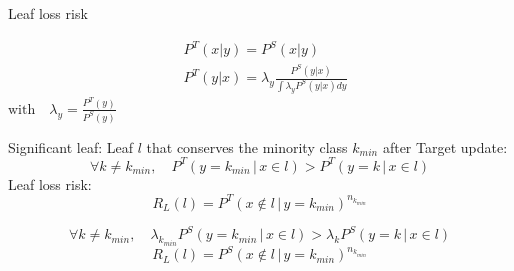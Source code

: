 \begin{frame}{Leaf loss risk}

\begin{minipage}[t]{0.38\textwidth}
    \vspace{0pt}
    \begin{tcolorbox}[title=Homogeneous class imbalance,size=title,boxrule=0.2pt]
    \begin{align*}
        & P^T(x|y) = P^S(x|y) \\
        & P^T(y|x) = \lambda_y \frac{P^S(y|x)}{\int{\lambda_y P^S(y|x)dy}}
    \end{align*}
        $\text{with} \quad \lambda_y = \frac{P^T(y)}{P^S(y)}$
    \end{tcolorbox}
\end{minipage}\hfill
\begin{minipage}[t]{0.59\textwidth}
    \vspace{0pt}
    \pause
    \begin{tcolorbox}[title=Leaf loss risk,size=title,boxrule=0.2pt]
            Significant leaf: Leaf $l$ that conserves the minority class $k_{min}$ after Target update:
        \begin{equation*}
        \forall k \neq k_{min},\quad {P}^T(y = k_{min} \,|\, x \in l) > {P}^T(y = k \,|\, x \in l) 
        \label{eqF_rep_targ}
        \end{equation*}
        Leaf loss risk:
        \begin{equation*}
        R_{L}(l)={P}^T(x \notin l \,|\, y = k_{min})^{n_{k_{min}}} 
        \label{eq_risk_value}
        \end{equation*}
    \end{tcolorbox}
\end{minipage}
\pause
\begin{tcolorbox}[title=Leaf loss risk under homogeneous class imbalance,size=title,boxrule=0.2pt]
    \begin{equation*}
    \forall k \neq k_{min}, \quad \lambda_{k_{min}}  {P}^S(y = k_{min} \,|\, x \in l) > \lambda_k  {P}^S(y = k \,|\, x \in l)
    \end{equation*}
    \begin{equation*}
    R_{L}(l)={P}^S(x \notin l \,|\, y = k_{min})^{n_{k_{min}}}
    \end{equation*}
\end{tcolorbox}

\end{frame}

